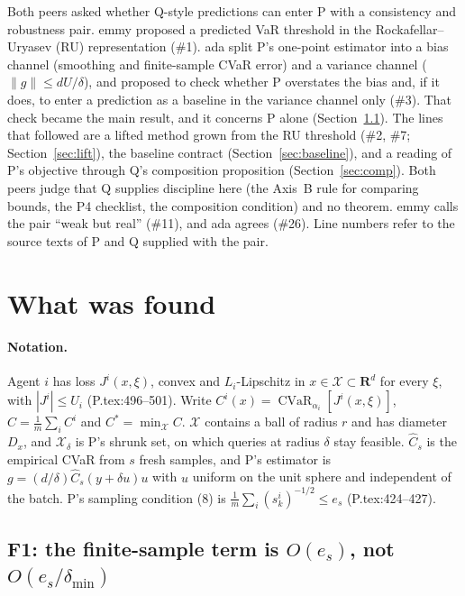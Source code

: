 \documentclass{article}
\newcommand{\CVaR}{\operatorname{CVaR}}
\begin{document}
Both peers asked whether Q-style predictions can enter P with a
consistency and robustness pair. emmy proposed a predicted VaR threshold in
the Rockafellar--Uryasev (RU) representation (\#1). ada split P's
one-point estimator into a bias channel (smoothing and finite-sample CVaR
error) and a variance channel ($\|g\|\le dU/\delta$), and proposed to check
whether P overstates the bias and, if it does, to enter a prediction as a
baseline in the variance channel only (\#3). That check became the main
result, and it concerns P alone (Section~\ref{sec:f1}). The lines that
followed are a lifted method grown from the RU threshold (\#2, \#7;
Section~\ref{sec:lift}), the baseline contract
(Section~\ref{sec:baseline}), and a reading of P's objective through Q's
composition proposition (Section~\ref{sec:comp}). Both peers judge that Q
supplies discipline here (the Axis~B rule for comparing bounds, the P4
checklist, the composition condition) and no theorem. emmy calls the pair
``weak but real'' (\#11), and ada agrees (\#26). Line numbers refer to the
source texts of P and Q supplied with the pair.

\section{What was found}

\paragraph{Notation.} Agent $i$ has loss $J^i(x,\xi)$, convex and
$L_i$-Lipschitz in $x\in\mathcal X\subset\mathbf R^d$ for every $\xi$, with
$|J^i|\le U_i$ (P.tex:496--501). Write $C^i(x)=\CVaR_{\alpha_i}[J^i(x,\xi)]$,
$C=\frac1m\sum_iC^i$ and $C^*=\min_{\mathcal X}C$. $\mathcal X$ contains a
ball of radius $r$ and has diameter $D_x$, and $\mathcal X_\delta$ is P's
shrunk set, on which queries at radius $\delta$ stay feasible. $\hat C_s$
is the empirical CVaR from $s$ fresh samples, and P's estimator is
$g=(d/\delta)\hat C_s(y+\delta u)u$ with $u$ uniform on the unit sphere and
independent of the batch. P's sampling condition (8) is
$\frac1m\sum_i(s_k^i)^{-1/2}\le e_s$ (P.tex:424--427).

\subsection{F1: the finite-sample term is $O(e_s)$, not
$O(e_s/\delta_{\min})$}\label{sec:f1}
\end{document}
